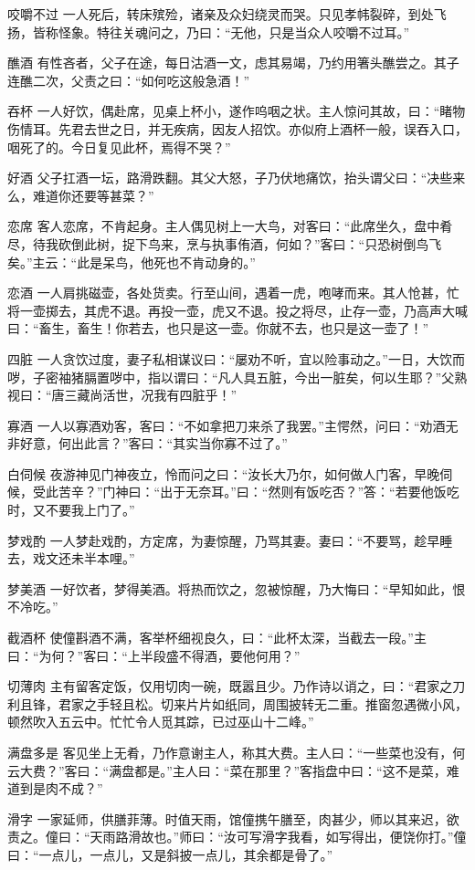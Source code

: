 \documentclass[12pt,UTF8]{ctexbook}
\begin{document}
咬嚼不过
一人死后，转床殡殓，诸亲及众妇绕灵而哭。只见孝帏裂碎，到处飞扬，皆称怪象。特往关魂问之，乃曰：“无他，只是当众人咬嚼不过耳。”

醮酒
有性吝者，父子在途，每日沽酒一文，虑其易竭，乃约用箸头醮尝之。其子连醮二次，父责之曰：“如何吃这般急酒！”

吞杯
一人好饮，偶赴席，见桌上杯小，遂作呜咽之状。主人惊问其故，曰：“睹物伤情耳。先君去世之日，并无疾病，因友人招饮。亦似府上酒杯一般，误吞入口，咽死了的。今日复见此杯，焉得不哭？”

好酒
父子扛酒一坛，路滑跌翻。其父大怒，子乃伏地痛饮，抬头谓父曰：“决些来么，难道你还要等甚菜？”

恋席
客人恋席，不肯起身。主人偶见树上一大鸟，对客曰：“此席坐久，盘中肴尽，待我砍倒此树，捉下鸟来，烹与执事侑酒，何如？”客曰：“只恐树倒鸟飞矣。”主云：“此是呆鸟，他死也不肯动身的。”

恋酒
一人肩挑磁壶，各处货卖。行至山间，遇着一虎，咆哮而来。其人怆甚，忙将一壶掷去，其虎不退。再投一壶，虎又不退。投之将尽，止存一壶，乃高声大喊曰：“畜生，畜生！你若去，也只是这一壶。你就不去，也只是这一壶了！”

四脏
一人贪饮过度，妻子私相谋议曰：“屡劝不听，宜以险事动之。”一日，大饮而哕，子密袖猪膈置哕中，指以谓曰：“凡人具五脏，今出一脏矣，何以生耶？”父熟视曰：“唐三藏尚活世，况我有四脏乎！”

寡酒
一人以寡酒劝客，客曰：“不如拿把刀来杀了我罢。”主愕然，问曰：“劝酒无非好意，何出此言？”客曰：“其实当你寡不过了。”

白伺候
夜游神见门神夜立，怜而问之曰：“汝长大乃尔，如何做人门客，早晚伺候，受此苦辛？”门神曰：“出于无奈耳。”曰：“然则有饭吃否？”答：“若要他饭吃时，又不要我上门了。”

梦戏酌
一人梦赴戏酌，方定席，为妻惊醒，乃骂其妻。妻曰：“不要骂，趁早睡去，戏文还未半本哩。”

梦美酒
一好饮者，梦得美酒。将热而饮之，忽被惊醒，乃大悔曰：“早知如此，恨不冷吃。”

截酒杯
使僮斟酒不满，客举杯细视良久，曰：“此杯太深，当截去一段。”主曰：“为何？”客曰：“上半段盛不得酒，要他何用？”

切薄肉
主有留客定饭，仅用切肉一碗，既嚣且少。乃作诗以诮之，曰：“君家之刀利且锋，君家之手轻且松。切来片片如纸同，周围披转无二重。推窗忽遇微小风，顿然吹入五云中。忙忙令人觅其踪，已过巫山十二峰。”

满盘多是
客见坐上无肴，乃作意谢主人，称其大费。主人曰：“一些菜也没有，何云大费？”客曰：“满盘都是。”主人曰：“菜在那里？”客指盘中曰：“这不是菜，难道到是肉不成？”

滑字
一家延师，供膳菲薄。时值天雨，馆僮携午膳至，肉甚少，师以其来迟，欲责之。僮曰：“天雨路滑故也。”师曰：“汝可写滑字我看，如写得出，便饶你打。”僮曰：“一点儿，一点儿，又是斜披一点儿，其余都是骨了。”
\end{document}
